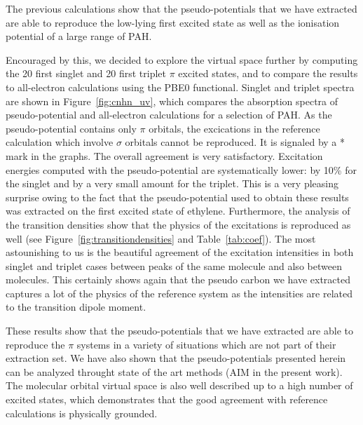 \documentclass[12pt]{article}
\begin{document}
The previous calculations show that the pseudo-potentials that we have extracted
are able to reproduce the low-lying first excited state as well as the ionisation potential
of a large range of PAH.

Encouraged by this, we decided to explore the virtual space further by computing the 20 first singlet
and 20 first triplet 
$\pi$ excited states, and to compare the results to all-electron calculations using the PBE0 functional.
Singlet and triplet spectra are shown in Figure~\ref{fig:cnhn_uv}, which compares the absorption
spectra of pseudo-potential and all-electron calculations for a selection of PAH.
As the pseudo-potential contains only $\pi$ orbitals, the excications in the reference
calculation which involve $\sigma$ orbitals cannot be reproduced.
It is signaled by a * mark in the graphs.
The overall agreement is very satisfactory.
Excitation energies computed with the pseudo-potential are systematically lower: by 10\%
for the singlet and by a very small amount for the triplet.
This is a very pleasing surprise owing to the fact that the pseudo-potential used
to obtain these results was extracted on the first excited state of ethylene.
Furthermore, the analysis of the transition densities show that the physics of the excitations
is reproduced as well (see Figure~\ref{fig:transitiondensities} and Table~\ref{tab:coef}).
The most astounishing to us is the beautiful agreement of the excitation intensities in
both singlet and triplet cases between peaks of the same molecule and also between
molecules.
This certainly shows again that the pseudo carbon we have extracted captures a lot of the
physics of the reference system as the intensities are related to the transition dipole moment.

These results show that the pseudo-potentials that we have extracted are able to reproduce the
$\pi$ systems in a variety of situations which are not part of their extraction set.
We have also shown that the pseudo-potentials presented herein can be analyzed throught state of the
art methods (AIM in the present work).
The molecular orbital virtual space is also well described up to a high number of excited states,
which demonstrates that the good agreement with reference calculations is
physically grounded.
\end{document}
